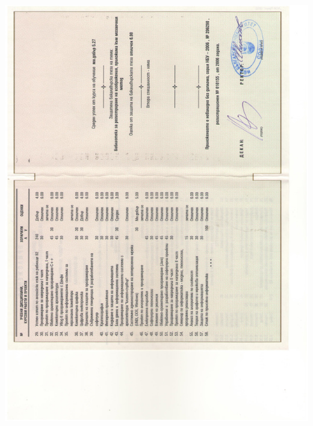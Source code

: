 \documentclass[english,a4paper]{europasscv}
\begin{document}
\includegraphics[width=\textwidth,height=\textheight,keepaspectratio]{DiplomaNBU2006_4}
\end{document}
